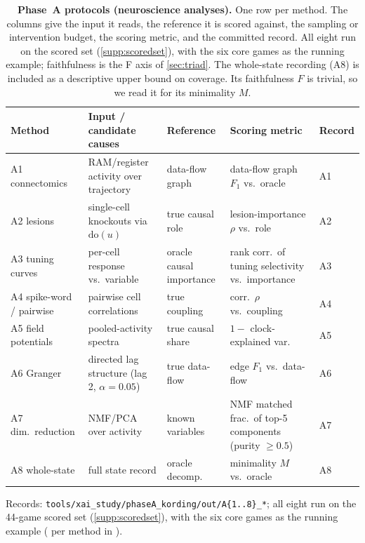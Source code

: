 \begin{table}[t]
\centering
\caption{\textbf{Phase~A protocols (neuroscience analyses).} One row per method. The columns
give the input it reads, the reference it is scored against, the sampling or intervention
budget, the scoring metric, and the committed record. All eight run on the scored set
(\Sectionname\ref{supp:scoredset}), with the six core games as the running example;
faithfulness is the F axis of \Sectionname\ref{sec:triad}. The whole-state recording (A8) is included as a
descriptive upper bound on coverage. Its faithfulness $F$ is trivial, so we read it for its
minimality $M$.}
\label{supp:tab:phaseA}
\scriptsize
\setlength{\tabcolsep}{4pt}
\begin{tabular}{@{}p{1.7cm}p{2.6cm}p{1.9cm}p{2.6cm}p{1.0cm}@{}}
\toprule
Method & Input / candidate causes & Reference & Scoring metric & Record \\
\midrule
A1 connectomics & RAM/register activity over trajectory & data-flow graph & data-flow graph $F_1$ vs.\ oracle & A1 \\
A2 lesions & single-cell knockouts via $\mathrm{do}(u)$ & true causal role & lesion-importance $\rho$ vs.\ role & A2 \\
A3 tuning curves & per-cell response vs.\ variable & oracle causal importance & rank corr.\ of tuning selectivity vs.\ importance & A3 \\
A4 spike-word / pairwise & pairwise cell correlations & true coupling & corr.\ $\rho$ vs.\ coupling & A4 \\
A5 field potentials & pooled-activity spectra & true causal share & $1-$ clock-explained var. & A5 \\
A6 Granger & directed lag structure (lag 2, $\alpha=0.05$) & true data-flow & edge $F_1$ vs.\ data-flow & A6 \\
A7 dim.\ reduction & NMF/PCA over activity & known variables & NMF matched frac.\ of top-5 components (purity $\geq0.5$) & A7 \\
A8 whole-state & full state record & oracle decomp. & minimality $M$ vs.\ oracle & A8 \\
\bottomrule
\end{tabular}

\smallskip
\noindent\scriptsize Records: \texttt{tools/xai\_study/phaseA\_kording/out/A\{1..8\}\_*}; all
eight run on the 44-game scored set (\Sectionname\ref{supp:scoredset}), with the six core
games as the running example ( per method in ).
\end{table}

